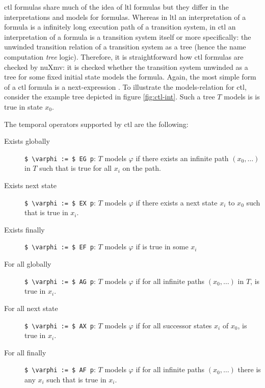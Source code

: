 
\gls{ctl} formulas share much of the idea of \gls{ltl} formulas but they differ in the interpretations and models for formulas.
Whereas in \gls{ltl} an interpretation of a formula is a infinitely long execution path of a transition system, in \gls{ctl} an interpretation of a formula is a transition system itself or more specifically: the unwinded transition relation of a transition system as a tree (hence the name computation \textit{tree} logic).
Therefore, it is straightforward how \gls{ctl} formulas are checked by nuXmv: it is checked whether the transition system unwinded as a tree for some fixed initial state models the formula.
Again, the most simple form of a \gls{ctl} formula is a next-expression .
To illustrate the models-relation for \gls{ctl}, consider the example tree depicted in figure \ref{fig:ctl-int}.
Such a tree $ T $ models  is  is true in state $ x_0 $.

The temporal operators supported by \gls{ctl} are the following:
\begin{description}
    \item[Exists globally] \lstinline[language=smv,mathescape=true]{$ \varphi := $ EG p}: $ T $ models $ \varphi $ if there exists an infinite path $ (x_0, \dots) $ in $ T $ such that  is true for all $ x_i $ on the path.
    \item[Exists next state] \lstinline[language=smv,mathescape=true]{$ \varphi := $ EX p}: $ T $ models $ \varphi $ if there exists a next state $ x_i $ to $ x_0 $ such that  is true in $ x_i $.
    \item[Exists finally] \lstinline[language=smv,mathescape=true]{$ \varphi := $ EF p}: $ T $ models $ \varphi $ if  is true in some $ x_i $
    \item[For all globally] \lstinline[language=smv,mathescape=true]{$ \varphi := $ AG p}: $ T $ models $ \varphi $ if for all infinite paths $ (x_0, \dots) $ in $ T $,  is true in $ x_i $.
    \item[For all next state] \lstinline[language=smv,mathescape=true]{$ \varphi := $ AX p}: $ T $ models $ \varphi $ if for all successor states $ x_i $ of $ x_0 $,  is true in $ x_i $.
    \item[For all finally] \lstinline[language=smv,mathescape=true]{$ \varphi := $ AF p}: $ T $ models $ \varphi $ if for all infinite paths $ (x_0, \dots) $ there is any $ x_i $ such that  is true in $ x_i $.
\end{description}

